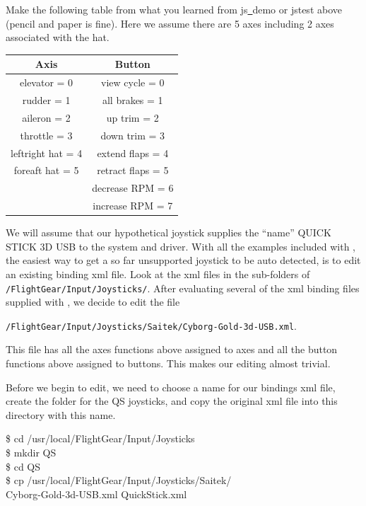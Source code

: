  Make the following table from what you learned from js\underline{~}demo or jstest above (pencil and paper is fine).  Here we assume there are 5 axes including 2 axes associated with the hat.
\medskip

\begin{tabular}{c|c}
		Axis			      &           Button\\\hline
	elevator 	= 0	     &     	view cycle 	= 0\\
	rudder 		= 1	     &     	all brakes 	= 1\\
	aileron 	= 2	     &      	up trim 	= 2\\
	throttle 	= 3		   &       down trim 	= 3\\
	leftright hat 	= 4&	    	extend flaps	= 4\\
	foreaft hat 	= 5	&	      retract flaps	= 5\\
					          &        decrease RPM	= 6\\
					          &        increase RPM	= 7
\end{tabular}
\medskip


We will assume that our hypothetical joystick supplies the ``name'' QUICK STICK 3D USB to the system and driver. With all the examples included with \FlightGear{}, the easiest way to get a so far unsupported joystick to be auto detected, is to edit an existing binding xml file.  Look at the xml files in the sub-folders of \texttt{/FlightGear/Input/Joysticks/}. After evaluating several of the xml binding files supplied with \FlightGear{}, we decide to edit the file

\noindent
 \texttt{/FlightGear/Input/Joysticks/Saitek/Cyborg-Gold-3d-USB.xml}.

 \noindent
  This file has all the axes functions above assigned to axes and all the button functions above assigned to buttons.  This makes our editing almost trivial.

Before we begin to edit, we need to choose a name for our bindings xml file, create the folder for the QS joysticks, and copy the original xml file into this directory with this name.
\medskip


\begin{ttfamily}
\noindent
\$ cd /usr/local/FlightGear/Input/Joysticks\\
\$ mkdir QS\\
\$ cd QS\\
\$ cp  /usr/local/FlightGear/Input/Joysticks/Saitek/\\
Cyborg-Gold-3d-USB.xml  QuickStick.xml
\end{ttfamily}
\medskip

